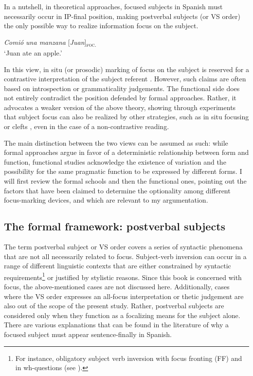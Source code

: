 In a nutshell, in theoretical approaches, focused subjects in Spanish must necessarily occur in IP-final position, making postverbal subjects (or VS order) the only possible way to realize information focus on the subject. 

 \ea \label{ex:2:4} \textit{Comió una manzana} {[\textit{Juan}]\textsubscript{\textsc{foc.}}}\normalsize \\
`Juan ate an apple.'
\z


In this view, in situ (or prosodic) marking of focus on the subject is reserved for a contrastive interpretation of the subject referent \parencite[228]{zubizarreta1999word}. 
However, such claims are often based on introspection or grammaticality judgements. The functional side does not entirely contradict the position defended by formal approaches. Rather, it advocates a weaker version of the above theory, showing through experiments that subject focus can also be realized by other strategies, such as in situ focusing \parencite{gabriel2007fokus, heidinger2013information, uth2014spanish} or clefts \parencite{feldhausen2015oraciones}, even in the case of a non-contrastive reading.

The main distinction between the two views can be assumed as such: while formal approaches argue in favor of a deterministic relationship between form and function, functional studies acknowledge the existence of variation and the possibility for the same pragmatic function to be expressed by different forms. I will first review the formal schools and then the functional ones, pointing out the factors that have been claimed to determine the optionality among different focus-marking devices, and which are relevant to my argumentation.

\subsection{The formal framework: postverbal subjects} \label{sub:3.2.1}
 
The term postverbal subject or VS order covers a series of syntactic phenomena that are not all necessarily related to focus. Subject-verb inversion can occur in a range of different linguistic contexts that are either constrained by syntactic requirements\footnote{For instance, obligatory subject verb inversion with focus fronting (FF) and in wh-questions (see \cite{gutierrez2013structural}).} or justified by stylistic reasons. Since this book is concerned with focus, the above-mentioned cases are not discussed here. Additionally, cases where the VS order expresses an all-focus interpretation or thetic judgement \parencite{sasse1987thetic} are also out of the scope of the present study. Rather, postverbal subjects are considered only when they function as a focalizing means for the subject alone. There are various explanations that can be found in the literature of why a focused subject must appear sentence-finally in Spanish.


